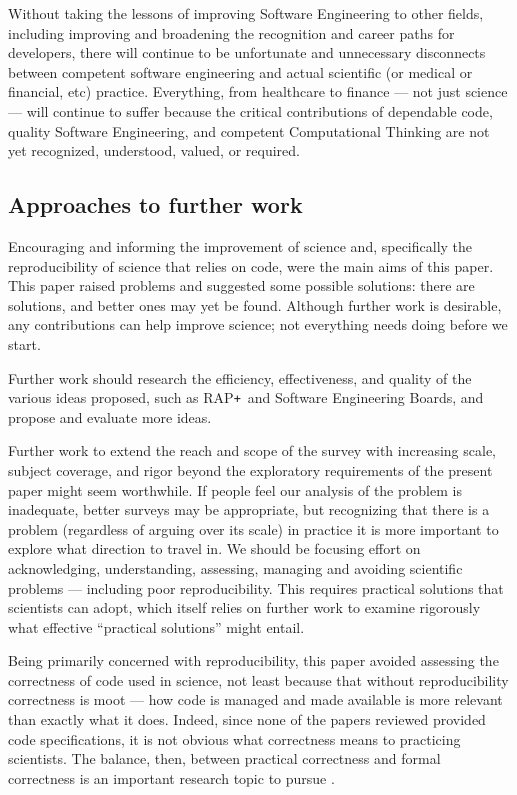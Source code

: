 \documentclass{comjnl}
\def\RAPstar{RAP{\tt +}}
\begin{document}
Without taking the lessons of improving Software Engineering to other fields, including improving and broadening the recognition and career paths for developers, there will continue to be unfortunate and unnecessary disconnects between competent software engineering and actual scientific (or medical or financial, etc) practice. Everything, from healthcare to finance --- not just science --- will continue to suffer because the critical contributions of dependable code, quality Software Engineering, and competent Computational Thinking are not yet recognized, understood, valued, or required. 

\subsection{Approaches to further work}
Encouraging and informing the improvement of science and, specifically the reproducibility of science that relies on code, were the main aims of this paper. This paper raised problems and suggested some possible solutions: there are solutions, and better ones may yet be found. Although further work is desirable, any contributions can help improve science; not everything needs doing before we start.

Further work should research the efficiency, effectiveness, and quality of the various ideas proposed, such as \RAPstar\ and Software Engineering Boards, and propose and evaluate more ideas.

Further work to extend the reach and scope of the survey with increasing scale, subject coverage, and rigor beyond the exploratory requirements of the present paper might seem worthwhile. If people feel our analysis of the problem is inadequate, better surveys may be appropriate, but recognizing that there is a problem (regardless of arguing over its scale) in practice it is more important to explore what direction to travel in. We should be focusing effort on acknowledging, understanding, assessing, managing and avoiding scientific problems --- including poor reproducibility. This requires practical solutions that scientists can adopt, which itself relies on further work to examine rigorously what effective ``practical solutions'' might entail.

Being primarily concerned with reproducibility, this paper avoided assessing the correctness of code used in science, not least because that without reproducibility correctness is moot --- how code is managed and made available is more relevant than exactly what it does. Indeed, since none of the papers reviewed provided code specifications, it is not obvious what correctness means to practicing scientists. The balance, then, between practical correctness and formal correctness is an important research topic to pursue \cite{hoare-unreasonable}.
\end{document}
